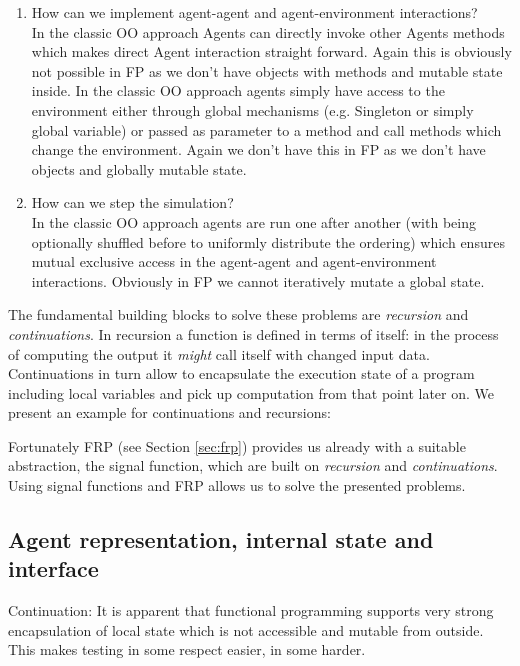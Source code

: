 \begin{enumerate}
	\item How can we implement agent-agent and agent-environment interactions? \\
	In the classic OO approach Agents can directly invoke other Agents methods which makes direct Agent interaction straight forward. Again this is obviously not possible in FP as we don't have objects with methods and mutable state inside.
		In the classic OO approach agents simply have access to the environment either through global mechanisms (e.g. Singleton or simply global variable) or passed as parameter to a method and call methods which change the environment. Again we don't have this in FP as we don't have objects and globally mutable state.
	
	\item How can we step the simulation? \\
	In the classic OO approach agents are run one after another (with being optionally shuffled before to uniformly distribute the ordering) which ensures mutual exclusive access in the agent-agent and agent-environment interactions. Obviously in FP we cannot iteratively mutate a global state.
\end{enumerate}

The fundamental building blocks to solve these problems are \textit{recursion} and \textit{continuations}. In recursion a function is defined in terms of itself: in the process of computing the output it \textit{might} call itself with changed input data. Continuations in turn allow to encapsulate the execution state of a program including local variables and pick up computation from that point later on. We present an example for continuations and recursions:

%
%
%

Fortunately FRP (see Section \ref{sec:frp}) provides us already with a suitable abstraction, the signal function, which are built on \textit{recursion} and \textit{continuations}. Using signal functions and FRP allows us to solve the presented problems.

\subsection{Agent representation, internal state and interface}
Continuation: It is apparent that functional programming supports very strong encapsulation of local state which is not accessible and mutable from outside. This makes testing in some respect easier, in some harder. 

